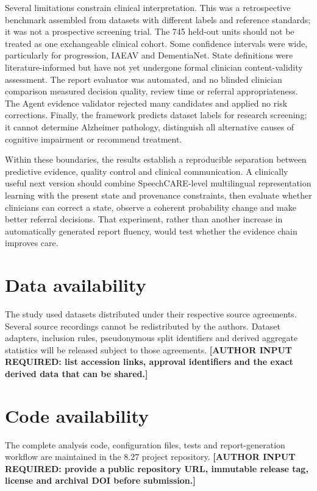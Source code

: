 \documentclass[pdflatex,sn-nature]{sn-jnl}
\begin{document}
Several limitations constrain clinical interpretation. This was a retrospective benchmark assembled from datasets with different labels and reference standards; it was not a prospective screening trial. The 745 held-out units should not be treated as one exchangeable clinical cohort. Some confidence intervals were wide, particularly for progression, IAEAV and DementiaNet. State definitions were literature-informed but have not yet undergone formal clinician content-validity assessment. The report evaluator was automated, and no blinded clinician comparison measured decision quality, review time or referral appropriateness. The Agent evidence validator rejected many candidates and applied no risk corrections. Finally, the framework predicts dataset labels for research screening; it cannot determine Alzheimer pathology, distinguish all alternative causes of cognitive impairment or recommend treatment.

Within these boundaries, the results establish a reproducible separation between predictive evidence, quality control and clinical communication. A clinically useful next version should combine SpeechCARE-level multilingual representation learning with the present state and provenance constraints, then evaluate whether clinicians can correct a state, observe a coherent probability change and make better referral decisions. That experiment, rather than another increase in automatically generated report fluency, would test whether the evidence chain improves care.

\section*{Data availability}

The study used datasets distributed under their respective source agreements. Several source recordings cannot be redistributed by the authors. Dataset adapters, inclusion rules, pseudonymous split identifiers and derived aggregate statistics will be released subject to those agreements. \textbf{[AUTHOR INPUT REQUIRED: list accession links, approval identifiers and the exact derived data that can be shared.]}

\section*{Code availability}

The complete analysis code, configuration files, tests and report-generation workflow are maintained in the 8.27 project repository. \textbf{[AUTHOR INPUT REQUIRED: provide a public repository URL, immutable release tag, license and archival DOI before submission.]}
\end{document}
